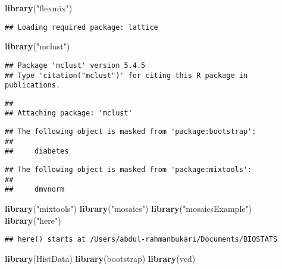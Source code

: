 \documentclass[]{article}
\newenvironment{Shaded}{\begin{snugshade}}{\end{snugshade}}
\newcommand{\KeywordTok}[1]{\textcolor[rgb]{0.13,0.29,0.53}{\textbf{#1}}}
\newcommand{\NormalTok}[1]{#1}
\newcommand{\StringTok}[1]{\textcolor[rgb]{0.31,0.60,0.02}{#1}}
\begin{document}
\begin{Shaded}
\begin{Highlighting}[]
\KeywordTok{library}\NormalTok{(}\StringTok{"flexmix"}\NormalTok{)}
\end{Highlighting}
\end{Shaded}

\begin{verbatim}
## Loading required package: lattice
\end{verbatim}

\begin{Shaded}
\begin{Highlighting}[]
\KeywordTok{library}\NormalTok{(}\StringTok{"mclust"}\NormalTok{)}
\end{Highlighting}
\end{Shaded}

\begin{verbatim}
## Package 'mclust' version 5.4.5
## Type 'citation("mclust")' for citing this R package in publications.
\end{verbatim}

\begin{verbatim}
## 
## Attaching package: 'mclust'
\end{verbatim}

\begin{verbatim}
## The following object is masked from 'package:bootstrap':
## 
##     diabetes
\end{verbatim}

\begin{verbatim}
## The following object is masked from 'package:mixtools':
## 
##     dmvnorm
\end{verbatim}

\begin{Shaded}
\begin{Highlighting}[]
\KeywordTok{library}\NormalTok{(}\StringTok{"mixtools"}\NormalTok{)}
\KeywordTok{library}\NormalTok{(}\StringTok{"mosaics"}\NormalTok{)}
\KeywordTok{library}\NormalTok{(}\StringTok{"mosaicsExample"}\NormalTok{)}
\KeywordTok{library}\NormalTok{(}\StringTok{"here"}\NormalTok{)}
\end{Highlighting}
\end{Shaded}

\begin{verbatim}
## here() starts at /Users/abdul-rahmanbukari/Documents/BIOSTATS
\end{verbatim}

\begin{Shaded}
\begin{Highlighting}[]
\KeywordTok{library}\NormalTok{(HistData)}
\KeywordTok{library}\NormalTok{(bootstrap)}
\KeywordTok{library}\NormalTok{(vcd)}
\end{Highlighting}
\end{Shaded}
\end{document}
